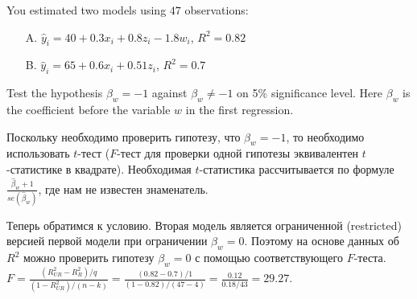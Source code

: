 \documentclass[addpoints, answers]{exam} %
\let\P\relax
\DeclareMathOperator{\P}{\mathbb{P}}
\begin{document}
\begin{questions}


\question[10]

You estimated two models using $47$ observations:

\begin{enumerate}
\item[A.]  $\hat y_i=40+0.3x_i+0.8z_i-1.8w_i$, $R^2=0.82$

\item[B.]  $\hat y_i=65+0.6x_i+0.51z_i$, $R^2=0.7$
\end{enumerate}

Test the hypothesis $\beta_w=-1$ against $\beta_w \ne -1$ on 5\% significance level. Here $\beta_w$ is the coefficient before the variable $w$  in the first regression.

\begin{solution}

Поскольку необходимо проверить гипотезу, что $\beta_w=-1$, то необходимо использовать $t$-тест ($F$-тест для проверки одной гипотезы эквивалентен $t$-статистике в квадрате). Необходимая $t$-статистика рассчитывается по формуле $\frac{\hat{\beta}_{w} +1}{se(\hat{\beta }_{w} )}$, где нам не известен знаменатель.

Теперь обратимся к условию. Вторая модель является ограниченной (restricted) версией первой модели при ограничении $\beta_w=0$. Поэтому на основе данных об $R^2$ можно проверить гипотезу $\beta_w=0$ с помощью соответствующего $F$-теста. $F=\frac{(R_{UR}^{2} -R_{R}^{2} )/q}{(1-R_{UR}^{2} )/(n-k)} =\frac{(0.82-0.7)/1}{(1-0.82)/(47-4)} =\frac{0.12}{0.18/43} =29.27$.


\end{solution}
\end{questions}
\end{document}

